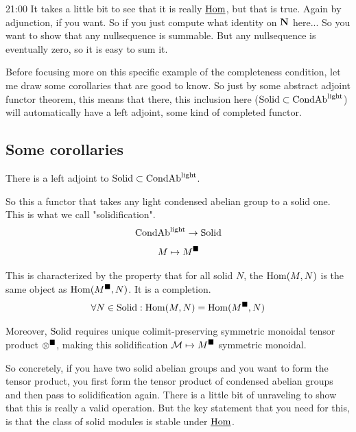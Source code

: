 \begin{unfinished}{21:00}
It takes a little bit to see that it is really $\operatorname{\underline{Hom}}$, but that is true. Again by adjunction, if you want. 
So if you just compute what identity on $\mathbf N$ here... 
So you want to show that any nullsequence is summable. But any nullsequence is eventually zero, so it is easy to sum it.

Before focusing more on this specific example of the completeness condition, let me draw some corollaries that are good to know. 
So just by some abstract adjoint functor theorem, this means that there, this inclusion here ($\mathrm{Solid} \subset \mathrm{Cond}\mathrm{Ab}^{\mathrm{light}}$) will automatically have a left adjoint, some kind of completed functor. 

\subsection{Some corollaries}

\begin{corollary}
There is a left adjoint to $\mathrm{Solid} \subset \mathrm{Cond}\mathrm{Ab}^{\mathrm{light}}$.

So this a functor that takes any light condensed abelian group to a solid one. 
This is what we call "solidification". 
\begin{align*}
\mathrm{Cond}\mathrm{Ab}^{\mathrm{light}} \to \mathrm{Solid}
\end{align*}
\begin{align*}
M \mapsto M^\blacksquare
\end{align*}

This is characterized by the property that for all solid $N$, the $\operatorname{Hom}(M,N)$ is the same object as $\operatorname{Hom}(M^\blacksquare,N)$. It is a completion.
\begin{align*}
\forall N \in \mathrm{Solid}: \operatorname{Hom}(M,N) = \operatorname{Hom}(M^\blacksquare, N)
\end{align*}

Moreover, $\mathrm{Solid}$ requires unique colimit-preserving symmetric monoidal tensor product $\otimes^\blacksquare$, making this solidification $\mathcal M \mapsto M^\blacksquare$ symmetric monoidal. 

So concretely, if you have two solid abelian groups and you want to form the tensor product, you first form the tensor product of condensed abelian groups and then pass to solidification again. There is a little bit of unraveling to show that this is really a valid  operation. But the key statement that you need for this, is that the class of solid modules is stable under $\operatorname{\underline{Hom}}$.

\end{corollary}



\end{unfinished}
